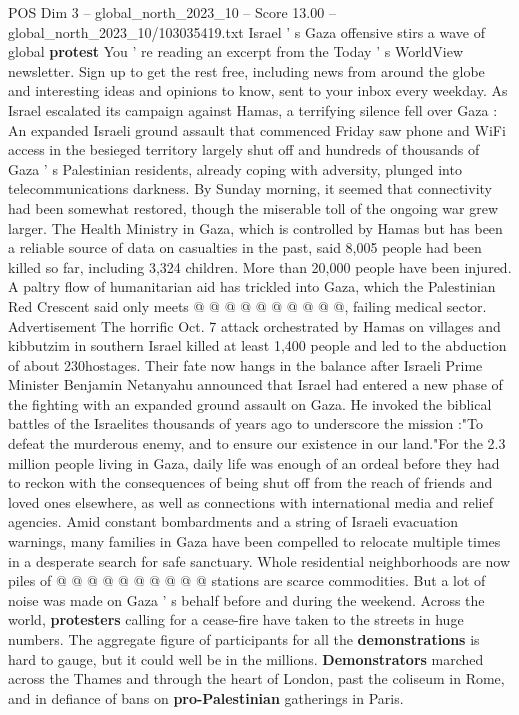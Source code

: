\begin{textsample}{POS Dim 3 – global\_north\_2023\_10 – Score 13.00 – global\_north\_2023\_10/103035419.txt}  \label{ex:f3_pos_205}
Israel ' s Gaza offensive stirs a wave of global \textbf{protest} You ' re reading an excerpt from the Today ' s WorldView newsletter.
Sign up to get the rest free, including news from around the globe and interesting ideas and opinions to know, sent to your inbox every weekday.
As Israel escalated its campaign against Hamas, a terrifying silence fell over Gaza : An expanded Israeli ground assault that commenced Friday saw phone and WiFi access in the besieged territory largely shut off and hundreds of thousands of Gaza ' s Palestinian residents, already coping with adversity, plunged into telecommunications darkness.
By Sunday morning, it seemed that connectivity had been somewhat restored, though the miserable toll of the ongoing war grew larger.
The Health Ministry in Gaza, which is controlled by Hamas but has been a reliable source of data on casualties in the past, said 8,005 people had been killed so far, including 3,324 children.
More than 20,000 people have been injured.
A paltry flow of humanitarian aid has trickled into Gaza, which the Palestinian Red Crescent said only meets @ @ @ @ @ @ @ @ @ @, failing medical sector.
Advertisement The horrific Oct. 7 attack orchestrated by Hamas on villages and kibbutzim in southern Israel killed at least 1,400 people and led to the abduction of about 230hostages.
Their fate now hangs in the balance after Israeli Prime Minister Benjamin Netanyahu announced that Israel had entered a new phase of the fighting with an expanded ground assault on Gaza.
He invoked the biblical battles of the Israelites thousands of years ago to underscore the mission :"To defeat the murderous enemy, and to ensure our existence in our land."For the 2.3 million people living in Gaza, daily life was enough of an ordeal before they had to reckon with the consequences of being shut off from the reach of friends and loved ones elsewhere, as well as connections with international media and relief agencies.
Amid constant bombardments and a string of Israeli evacuation warnings, many families in Gaza have been compelled to relocate multiple times in a desperate search for safe sanctuary.
Whole residential neighborhoods are now piles of @ @ @ @ @ @ @ @ @ @ stations are scarce commodities.
But a lot of noise was made on Gaza ' s behalf before and during the weekend.
Across the world, \textbf{protesters} calling for a cease-fire have taken to the streets in huge numbers.
The aggregate figure of participants for all the \textbf{demonstrations} is hard to gauge, but it could well be in the millions. \textbf{Demonstrators} marched across the Thames and through the heart of London, past the coliseum in Rome, and in defiance of bans on \textbf{pro-Palestinian} gatherings in Paris.

\end{textsample}
